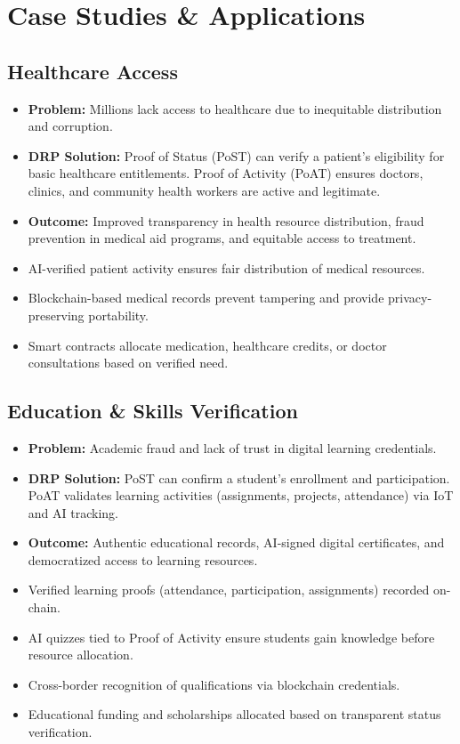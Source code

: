 \documentclass[11pt,a4paper]{article}
\begin{document}
\section{Case Studies \& Applications}

\subsection{Healthcare Access}
\begin{itemize}
    \item \textbf{Problem:} Millions lack access to healthcare due to inequitable distribution and corruption.
    \item \textbf{DRP Solution:} Proof of Status (PoST) can verify a patient's eligibility for basic healthcare entitlements. Proof of Activity (PoAT) ensures doctors, clinics, and community health workers are active and legitimate.
    \item \textbf{Outcome:} Improved transparency in health resource distribution, fraud prevention in medical aid programs, and equitable access to treatment.
    \item AI-verified patient activity ensures fair distribution of medical resources.
    \item Blockchain-based medical records prevent tampering and provide privacy-preserving portability.
    \item Smart contracts allocate medication, healthcare credits, or doctor consultations based on verified need.
\end{itemize}

\subsection{Education \& Skills Verification}
\begin{itemize}
    \item \textbf{Problem:} Academic fraud and lack of trust in digital learning credentials.
    \item \textbf{DRP Solution:} PoST can confirm a student's enrollment and participation. PoAT validates learning activities (assignments, projects, attendance) via IoT and AI tracking.
    \item \textbf{Outcome:} Authentic educational records, AI-signed digital certificates, and democratized access to learning resources.
    \item Verified learning proofs (attendance, participation, assignments) recorded on-chain.
    \item AI quizzes tied to Proof of Activity ensure students gain knowledge before resource allocation.
    \item Cross-border recognition of qualifications via blockchain credentials.
    \item Educational funding and scholarships allocated based on transparent status verification.
\end{itemize}
\end{document}
